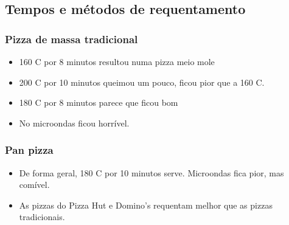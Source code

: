 \subsection*{Tempos e métodos de requentamento}

\subsubsection*{Pizza de massa tradicional}
\begin{itemize}
	\item 160 \grau C por 8 minutos resultou numa pizza meio mole
	\item 200 \grau C por 10 minutos queimou um pouco, ficou pior que a 160 \grau C.
	\item 180 \grau C por 8 minutos parece que ficou bom
	\item No microondas ficou horrível.
\end{itemize}

\subsubsection*{Pan pizza}
\begin{itemize}
  \item De forma geral, 180 \grau C por 10 minutos serve. Microondas fica pior, mas comível.
  \item As pizzas do Pizza Hut e Domino's requentam melhor que as pizzas tradicionais.
\end{itemize}

